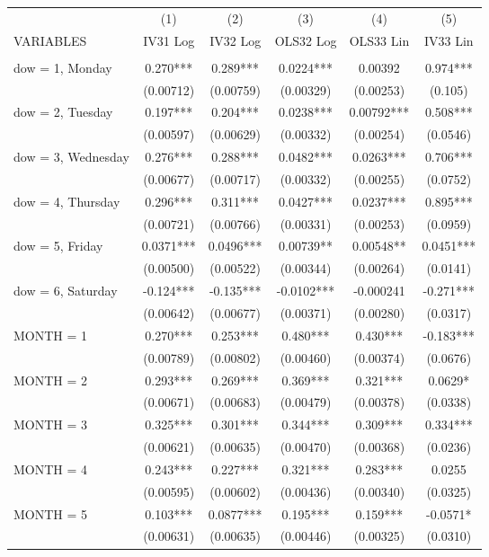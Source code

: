 \begin{tabular}{lccccc} \hline
 & (1) & (2) & (3) & (4) & (5) \\
VARIABLES & IV31 Log & IV32 Log & OLS32 Log & OLS33 Lin & IV33 Lin \\ \hline
 &  &  &  &  &  \\
dow = 1, Monday & 0.270*** & 0.289*** & 0.0224*** & 0.00392 & 0.974*** \\
 & (0.00712) & (0.00759) & (0.00329) & (0.00253) & (0.105) \\
dow = 2, Tuesday & 0.197*** & 0.204*** & 0.0238*** & 0.00792*** & 0.508*** \\
 & (0.00597) & (0.00629) & (0.00332) & (0.00254) & (0.0546) \\
dow = 3, Wednesday & 0.276*** & 0.288*** & 0.0482*** & 0.0263*** & 0.706*** \\
 & (0.00677) & (0.00717) & (0.00332) & (0.00255) & (0.0752) \\
dow = 4, Thursday & 0.296*** & 0.311*** & 0.0427*** & 0.0237*** & 0.895*** \\
 & (0.00721) & (0.00766) & (0.00331) & (0.00253) & (0.0959) \\
dow = 5, Friday & 0.0371*** & 0.0496*** & 0.00739** & 0.00548** & 0.0451*** \\
 & (0.00500) & (0.00522) & (0.00344) & (0.00264) & (0.0141) \\
dow = 6, Saturday & -0.124*** & -0.135*** & -0.0102*** & -0.000241 & -0.271*** \\
 & (0.00642) & (0.00677) & (0.00371) & (0.00280) & (0.0317) \\
MONTH = 1 & 0.270*** & 0.253*** & 0.480*** & 0.430*** & -0.183*** \\
 & (0.00789) & (0.00802) & (0.00460) & (0.00374) & (0.0676) \\
MONTH = 2 & 0.293*** & 0.269*** & 0.369*** & 0.321*** & 0.0629* \\
 & (0.00671) & (0.00683) & (0.00479) & (0.00378) & (0.0338) \\
MONTH = 3 & 0.325*** & 0.301*** & 0.344*** & 0.309*** & 0.334*** \\
 & (0.00621) & (0.00635) & (0.00470) & (0.00368) & (0.0236) \\
MONTH = 4 & 0.243*** & 0.227*** & 0.321*** & 0.283*** & 0.0255 \\
 & (0.00595) & (0.00602) & (0.00436) & (0.00340) & (0.0325) \\
MONTH = 5 & 0.103*** & 0.0877*** & 0.195*** & 0.159*** & -0.0571* \\
 & (0.00631) & (0.00635) & (0.00446) & (0.00325) & (0.0310) \\

\end{tabular}
